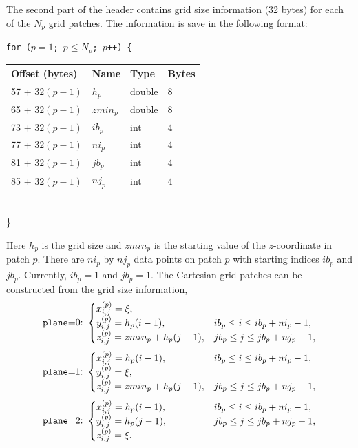 \documentclass[11pt]{report}
\begin{document}
The second part of the header contains grid size information (32 bytes)
for each of the $N_p$ grid patches. The information is save in the following format:
{\samepage
\begin{flushleft}
{\tt for ($p=1$; $p\leq N_p$; $p$++) \{}\nopagebreak \\ 
\hspace{5mm}
\begin{tabular}{llll}\hline
Offset (bytes) & Name & Type & Bytes \\ \hline
57 + $32(p - 1)$ & $h_{p}$ & double & 8 \\ \hline
65 + $32(p - 1)$ & $zmin_{p}$ & double & 8 \\ \hline
73 + $32(p - 1)$ & $ib_{p}$ & int & 4 \\ \hline
77 + $32(p - 1)$ & $ni_{p}$ & int & 4 \\ \hline
81 + $32(p - 1)$ & $jb_{p}$ & int & 4 \\ \hline
85 + $32(p - 1)$ & $nj_{p}$ & int & 4 \\ \hline
\end{tabular}\\
\}
\end{flushleft}
}
Here $h_p$ is the grid size and $zmin_p$ is the starting value of the $z$-coordinate in patch
$p$. There are $ni_p$ by $nj_p$ data points on patch $p$ with starting indices $ib_p$ and
$jb_p$. Currently, $ib_p=1$ and $jb_p=1$. The Cartesian grid patches can be constructed from the
grid size information,
\[
\mbox{{\tt plane}=0:}\ \begin{cases}
x^{(p)}_{i,j} = \xi,\\
y^{(p)}_{i,j} = h_p(i-1),& ib_p\leq i\leq ib_p+ni_p-1,\\
z^{(p)}_{i,j} = zmin_p + h_p(j-1),& jb_p\leq j\leq jb_p+nj_p-1,
\end{cases}
\]
\[
\mbox{{\tt plane}=1:}\ \begin{cases}
x^{(p)}_{i,j} = h_p(i-1),& ib_p\leq i\leq ib_p+ni_p-1,\\
y^{(p)}_{i,j} = \xi,\\
z^{(p)}_{i,j} = zmin_p + h_p(j-1),& jb_p\leq j\leq jb_p+nj_p-1,
\end{cases}
\]
\[
\mbox{{\tt plane}=2:}\ \begin{cases}
x^{(p)}_{i,j} = h_p(i-1),& \qquad \qquad ib_p\leq i\leq ib_p+ni_p-1, \\
y^{(p)}_{i,j} = h_p(j-1),& \qquad \qquad jb_p\leq j\leq jb_p+nj_p-1, \\
z^{(p)}_{i,j} = \xi.
\end{cases}
\]
\end{document}
